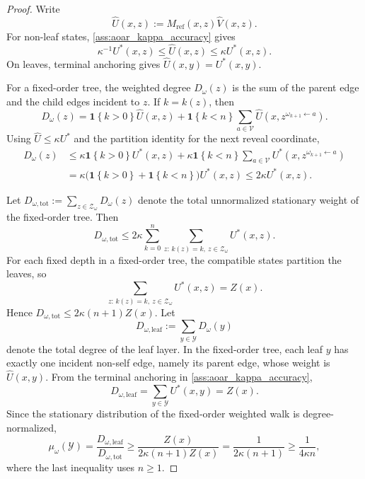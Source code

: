 \documentclass{article}
\numberwithin{theorem}{section}
\numberwithin{proposition}{section}
\numberwithin{corollary}{section}
\numberwithin{lemma}{section}
\numberwithin{conjecture}{section}
\numberwithin{remark}{section}
\numberwithin{definition}{section}
\numberwithin{assumption}{section}
\numberwithin{example}{section}
\newcommand{\calV}{{\mathcal{V}}}
\newcommand{\calY}{{\mathcal{Y}}}
\newcommand{\calZ}{{\mathcal{Z}}}
\newcommand{\mbra}[1]{\left\{#1\right\}}
\begin{document}
\begin{proof}
Write
\begin{equation*}
    \widehat U(x,z) := M_{\text{ref}}(x,z)\widehat V(x,z).
\end{equation*}
For non-leaf states, \cref{ass:aoar_kappa_accuracy} gives
\begin{equation*}
    \kappa^{-1}U^*(x,z) \le \widehat U(x,z) \le \kappa U^*(x,z).
\end{equation*}
On leaves, terminal anchoring gives $\widehat U(x,y)=U^*(x,y)$.

For a fixed-order tree, the weighted degree $D_\omega(z)$ is the sum of the parent edge and the child edges incident to $z$. If $k=k(z)$, then
\begin{equation*}
    D_\omega(z)=\mathbf{1}\mbra{k>0}\widehat U(x,z)+\mathbf{1}\mbra{k<n}\sum_{a\in\calV}\widehat U(x,z^{\omega_{k+1}\leftarrow a}).
\end{equation*}
Using $\widehat U\le \kappa U^*$ and the partition identity for the next reveal coordinate,
\begin{align*}
\label{eq:fixed_order_pointwise_degree_bound}
    D_\omega(z)
    &\le \kappa \mathbf{1}\mbra{k>0}U^*(x,z)+\kappa \mathbf{1}\mbra{k<n}\sum_{a\in\calV}U^*(x,z^{\omega_{k+1}\leftarrow a}) \nonumber \\
    &= \kappa\bigl(\mathbf{1}\mbra{k>0}+\mathbf{1}\mbra{k<n}\bigr)U^*(x,z) \le 2\kappa U^*(x,z).
\end{align*}

Let $D_{\omega,\mathrm{tot}}:=\sum_{z\in\calZ_\omega}D_\omega(z)$ denote the total unnormalized stationary weight of the fixed-order tree. Then
\begin{equation*}
    D_{\omega,\mathrm{tot}}\le 2\kappa \sum_{k=0}^n \sum_{z:\,k(z)=k,\ z\in\calZ_\omega} U^*(x,z).
\end{equation*}
For each fixed depth in a fixed-order tree, the compatible states partition the leaves, so
\begin{equation*}
    \sum_{z:\,k(z)=k,\ z\in\calZ_\omega} U^*(x,z) = Z(x).
\end{equation*}
Hence $D_{\omega,\mathrm{tot}}\le 2\kappa(n+1)Z(x)$. Let
\begin{equation*}
    D_{\omega,\mathrm{leaf}}:=\sum_{y\in\calY}D_\omega(y)
\end{equation*}
denote the total degree of the leaf layer. In the fixed-order tree, each leaf $y$ has exactly one incident non-self edge, namely its parent edge, whose weight is $\widehat U(x,y)$. From the terminal anchoring in \cref{ass:aoar_kappa_accuracy},
\begin{equation*}
    D_{\omega,\mathrm{leaf}}=\sum_{y\in\calY}U^*(x,y)=Z(x).
\end{equation*}
Since the stationary distribution of the fixed-order weighted walk is degree-normalized,
\begin{equation*}
    \mu_\omega(\calY)=\frac{D_{\omega,\mathrm{leaf}}}{D_{\omega,\mathrm{tot}}}\ge \frac{Z(x)}{2\kappa(n+1)Z(x)}=\frac{1}{2\kappa(n+1)}\ge \frac{1}{4\kappa n},
\end{equation*}
where the last inequality uses $n\ge 1$.


\end{proof}
\end{document}
